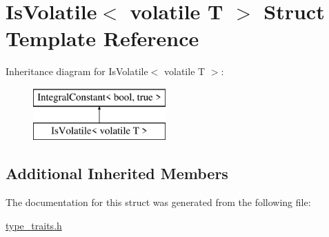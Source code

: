 \hypertarget{struct_is_volatile_3_01volatile_01_t_01_4}{}\section{Is\+Volatile$<$ volatile T $>$ Struct Template Reference}
\label{struct_is_volatile_3_01volatile_01_t_01_4}
Inheritance diagram for Is\+Volatile$<$ volatile T $>$\+:\begin{figure}[H]
\begin{center}
\leavevmode
\includegraphics[height=2.000000cm]{struct_is_volatile_3_01volatile_01_t_01_4}
\end{center}
\end{figure}
\subsection*{Additional Inherited Members}


The documentation for this struct was generated from the following file\+:\begin{DoxyCompactItemize}
\item 
\hyperlink{type__traits_8h}{type\+\_\+traits.\+h}\end{DoxyCompactItemize}
